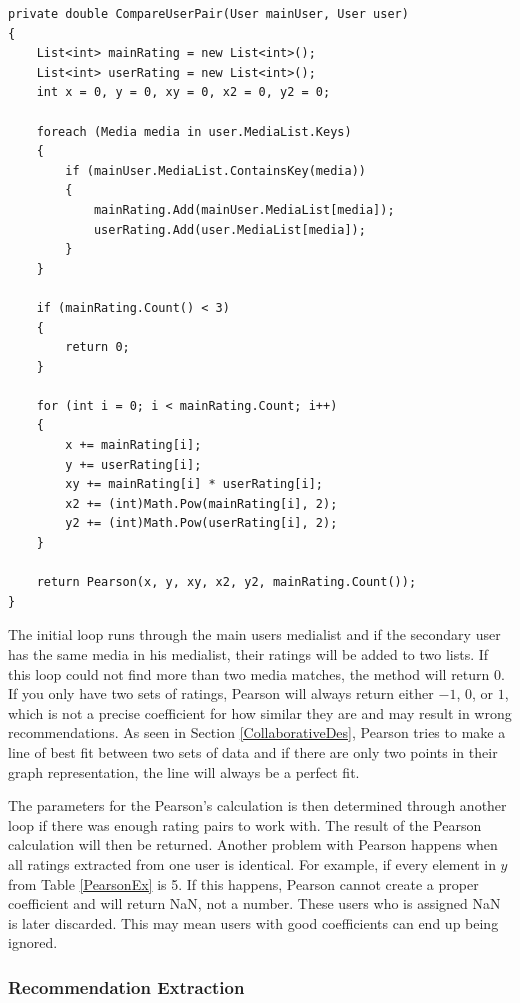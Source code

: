 \begin{lstlisting}[caption={The CompareUserPair method},label={CompareUserPairTwo}]
private double CompareUserPair(User mainUser, User user)
{
	List<int> mainRating = new List<int>();
	List<int> userRating = new List<int>();
	int x = 0, y = 0, xy = 0, x2 = 0, y2 = 0;

	foreach (Media media in user.MediaList.Keys)
	{
		if (mainUser.MediaList.ContainsKey(media))
		{
			mainRating.Add(mainUser.MediaList[media]);
			userRating.Add(user.MediaList[media]);
		}
	}

	if (mainRating.Count() < 3)
	{
		return 0;
	}

	for (int i = 0; i < mainRating.Count; i++)
	{
		x += mainRating[i];
		y += userRating[i];
		xy += mainRating[i] * userRating[i];
		x2 += (int)Math.Pow(mainRating[i], 2);
		y2 += (int)Math.Pow(userRating[i], 2);
	}

	return Pearson(x, y, xy, x2, y2, mainRating.Count());
}
\end{lstlisting}

The initial loop runs through the main users medialist and if the secondary user has the same media in his medialist, their ratings will be added to two lists. If this loop could not find more than two media matches, the method will return 0. If you only have two sets of ratings, Pearson will always return either $-1$, $0$, or $1$, which is not a precise coefficient for how similar they are and may result in wrong recommendations. As seen in Section \ref{CollaborativeDes}, Pearson tries to make a line of best fit between two sets of data and if there are only two points in their graph representation, the line will always be a perfect fit. 


The parameters for the Pearson's calculation is then determined through another loop if there was enough rating pairs to work with. The result of the Pearson calculation will then be returned. Another problem with Pearson happens when all ratings extracted from one user is identical. For example, if every element in $y$ from Table \ref{PearsonEx} is 5. If this happens, Pearson cannot create a proper coefficient and will return NaN, not a number. These users who is assigned NaN is later discarded. This may mean users with good coefficients can end up being ignored.

\subsubsection{Recommendation Extraction}

